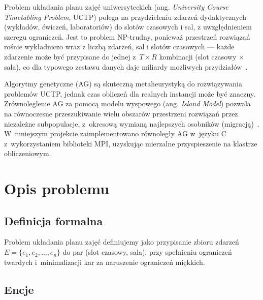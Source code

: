 \documentclass[12pt,a4paper]{article}
\begin{document}
Problem uk\l{}adania planu zaj\k{e}\'{c} uniwersyteckich (ang. \textit{University Course Timetabling Problem}, UCTP) polega na przydzieleniu zdarze\'{n} dydaktycznych (wyk\l{}ad\'{o}w, \'{c}wicze\'{n}, laboratori\'{o}w) do slot\'{o}w czasowych i sal, z uwzgl\k{e}dnieniem szeregu ogranicze\'{n}. Jest to problem NP-trudny, poniewa\.{z} przestrze\'{n} rozwi\k{a}za\'{n} ro\'{s}nie wyk\l{}adniczo wraz z liczb\k{a} zdarze\'{n}, sal i slot\'{o}w czasowych --- ka\.{z}de zdarzenie mo\.{z}e by\'{c} przypisane do jednej z~$T \times R$ kombinacji (slot czasowy $\times$ sala), co dla typowego zestawu danych daje miliardy mo\.{z}liwych przydzia\l{}\'{o}w~\cite{banczyk}.

Algorytmy genetyczne (AG) s\k{a} skuteczn\k{a} metaheurystyk\k{a} do rozwi\k{a}zywania problem\'{o}w UCTP, jednak czas oblicze\'{n} dla realnych instancji mo\.{z}e by\'{c} znaczny. Zr\'{o}wnoleglenie AG za pomoc\k{a} modelu wyspowego (ang. \textit{Island Model}) pozwala na r\'{o}wnoczesne przeszukiwanie wielu obszar\'{o}w przestrzeni rozwi\k{a}za\'{n} przez niezale\.{z}ne subpopulacje, z~okresow\k{a} wymian\k{a} najlepszych osobnik\'{o}w (migracj\k{a})~\cite{faris}. W~niniejszym projekcie zaimplementowano r\'{o}wnoleg\l{}y AG w~j\k{e}zyku C z~wykorzystaniem biblioteki MPI, uzyskuj\k{a}c mierzalne przyspieszenie na klastrze obliczeniowym.

\section{Opis problemu}

\subsection{Definicja formalna}

Problem uk\l{}adania planu zaj\k{e}\'{c} definiujemy jako przypisanie zbioru zdarze\'{n} $E = \{e_1, e_2, \ldots, e_n\}$ do par (slot czasowy, sala), przy spe\l{}nieniu ogranicze\'{n} twardych i~minimalizacji kar za naruszenie ogranicze\'{n} mi\k{e}kkich.

\subsection{Encje}
\end{document}
